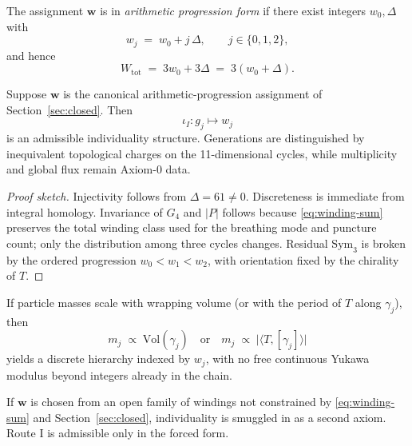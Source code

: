 \begin{definition}
\label{def:AP}
The assignment \(\mathbf{w}\) is in \emph{arithmetic progression form} if there
exist integers \(w_0,\Delta\) with
\begin{equation}
\label{eq:AP}
w_j \;=\; w_0 + j\,\Delta,\qquad j\in\{0,1,2\},
\end{equation}
and hence
\begin{equation}
\label{eq:AP-sum}
W_{\mathrm{tot}} \;=\; 3w_0 + 3\Delta \;=\; 3(w_0+\Delta).
\end{equation}
\end{definition}

\begin{theorem}
\label{thm:route1}
Suppose \(\mathbf{w}\) is the canonical arithmetic-progression assignment of
Section~\ref{sec:closed}. Then
\[
\iota_I\colon g_j\mapsto w_j
\]
is an admissible individuality structure. Generations are distinguished by
inequivalent topological charges on the 11-dimensional cycles, while
multiplicity and global flux remain Axiom-0 data.
\end{theorem}

\begin{proof}[Proof sketch]
Injectivity follows from \(\Delta=61\neq 0\). Discreteness is immediate from
integral homology. Invariance of \(G_4\) and \(|P|\) follows because
\eqref{eq:winding-sum} preserves the total winding class used for the breathing
mode and puncture count; only the distribution among three cycles changes.
Residual \(\mathrm{Sym}_3\) is broken by the ordered progression
\(w_0<w_1<w_2\), with orientation fixed by the chirality of \(T\).
\end{proof}

\begin{corollary}
If particle masses scale with wrapping volume (or with the period of \(T\) along
\(\gamma_j\)), then
\[
m_j \;\propto\; \mathrm{Vol}(\gamma_j)
\quad\text{or}\quad
m_j \;\propto\; \bigl|\langle T,[ \gamma_j]\rangle\bigr|
\]
yields a discrete hierarchy indexed by \(w_j\), with no free continuous Yukawa
modulus beyond integers already in the chain.
\end{corollary}

\begin{remark}
If \(\mathbf{w}\) is chosen from an open family of windings not constrained by
\eqref{eq:winding-sum} and Section~\ref{sec:closed}, individuality is smuggled
in as a second axiom. Route I is admissible only in the forced form.
\end{remark}

